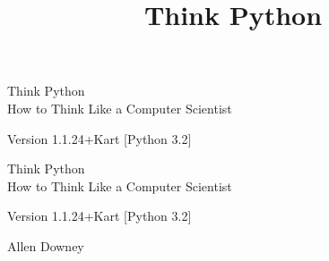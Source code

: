 \documentclass[10pt]{book}
\title{Think Python}
\newcommand{\theversion}{1.1.24+Kart [Python 3.2]}
\begin{document}
\frontmatter




\newtheorem{ex}{Exercise}[chapter]

\begin{latexonly}

\renewcommand{\blankpage}{\thispagestyle{empty} \quad \newpage}



\thispagestyle{empty}

\begin{flushright}
\vspace*{2.0in}

\begin{spacing}{3}
{\huge Think Python}\\
{\Large How to Think Like a Computer Scientist}
\end{spacing}

\vspace{0.25in}

Version \theversion

\vfill

\end{flushright}


\blankpage
\blankpage

\pagebreak
\thispagestyle{empty}

\begin{flushright}
\vspace*{2.0in}

\begin{spacing}{3}
{\huge Think Python}\\
{\Large How to Think Like a Computer Scientist}
\end{spacing}

\vspace{0.25in}

Version \theversion

\vspace{1in}


{\Large
Allen Downey\\
}



\end{flushright}
\end{latexonly}
\end{document}
